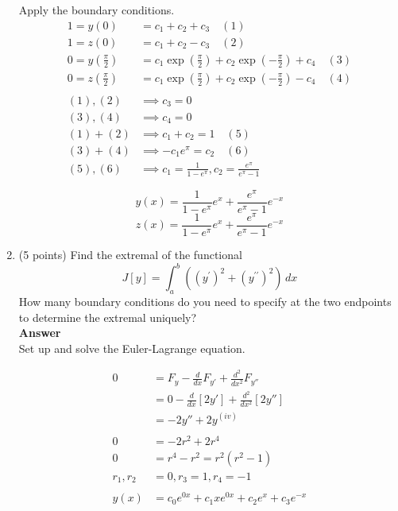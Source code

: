 \documentclass[12pt]{article}
\begin{document}
\begin{enumerate}
Apply the boundary conditions. 
\begin{align*}
1 = y(0) &= c_1 + c_2 + c_3 \quad (1)\\
1 = z(0) &= c_1 + c_2 - c_3 \quad (2)\\
0 = y\left(\frac{\pi}{2}\right) &= c_1\exp\left(\frac{\pi}{2}\right) + c_2\exp\left(-\frac{\pi}{2}\right)  + c_4  \quad (3)\\
0 = z\left(\frac{\pi}{2}\right) &= c_1\exp\left(\frac{\pi}{2}\right) + c_2\exp\left(-\frac{\pi}{2}\right)  - c_4 \quad (4) \\
& \\
(1),(2) &\implies c_3 = 0 \\
(3),(4) & \implies c_4 = 0 \\
(1) + (2) & \implies c_1+c_2 = 1  \quad (5)\\
(3) + (4) & \implies -c_1e^\pi = c_2  \quad (6)\\
(5),(6) &\implies c_1 = \frac{1}{1- e^\pi}, c_2 = \frac{e^\pi}{e^\pi - 1}
\end{align*}

$$\boxed{ y(x) = \frac{1}{1- e^\pi}e^x + \frac{e^\pi}{e^\pi - 1}e^{-x} }$$
$$\boxed{ z(x) = \frac{1}{1- e^\pi}e^x + \frac{e^\pi}{e^\pi - 1}e^{-x} } $$

\newpage
\item (5 points)\,\,Find the extremal of the functional
$$
J[y] = \int_a ^b \left((y^{\prime})^2 + (y^{\prime\prime})^2 \right) \,dx
$$
How many boundary conditions do you need to specify at the two endpoints to determine the extremal uniquely?\\

{\bf Answer} \\

Set up and solve the Euler-Lagrange equation.

\begin{align*}
0 &= F_y - \frac{d}{dx}F_{y'} + \frac{d^2}{dx^2}F_{y''} \\
&= 0 - \frac{d}{dx}[2y'] + \frac{d^2}{dx^2}[2y''] \\
&= -2y'' + 2y^{(iv)} \\
& \\
0 &= -2r^2 +2r^4 \\
0 &= r^4 -r^2 = r^2(r^2 - 1) \\
r_1,r_2 &= 0, r_3 = 1, r_4 = -1\\
& \\
y(x) &= c_0e^{0x} + c_1xe^{0x} + c_2e^{x} + c_3 e^{-x}
\end{align*}


\end{enumerate}
\end{document}
